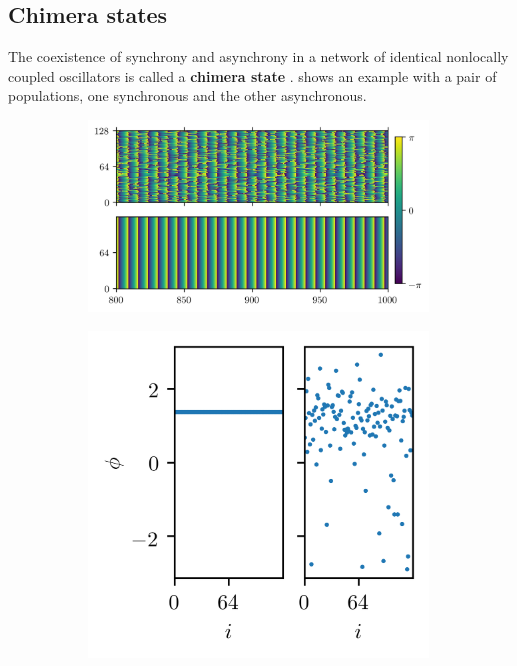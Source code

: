 \documentclass{beamer}
\begin{document}
\begin{frame}[t]
\begin{multicols}{3}
    \section{Chimera states}
    The coexistence of synchrony and asynchrony in a network of identical nonlocally coupled oscillators is called a \textbf{chimera state} \cite{Kuramoto2002,Abrams2004}.
     shows an example with a pair of populations, one synchronous and the other asynchronous.
    \begin{figure}
      \begin{subfigure}{0.66\columnwidth}
        \centering
        \includegraphics[width=0.99\textwidth]{figure/abrams_overhead}
        \caption{}
        \label{fig:abrams_overhead}
      \end{subfigure}%
      \begin{subfigure}{0.33\columnwidth}
        \centering
        \includegraphics[width=0.99\textwidth]{figure/abrams_snapshot}

\end{subfigure}
\end{figure}
\end{multicols}
\end{frame}
\end{document}
